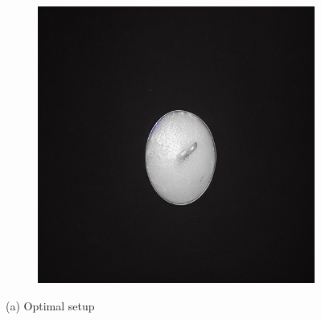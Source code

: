 \documentclass[12pt,DIV14,BCOR12mm,a4paper,footinclude=false,headinclude,parskip=half-,twoside,openright,cleardoublepage=empty,toc=index,bibliography=totoc,listof=totoc]{scrreprt}
\numberwithin{equation}{chapter}
\begin{document}
\begin{figure}
\begin{subfigure}[t]{0.45\textwidth}
        \includegraphics[width=\textwidth]{../media/diff_candles_optimal_fake.png}
    \end{subfigure}
    \caption*{(a) Optimal setup}

    \vspace{0.3cm} %


\end{figure}
\end{document}
